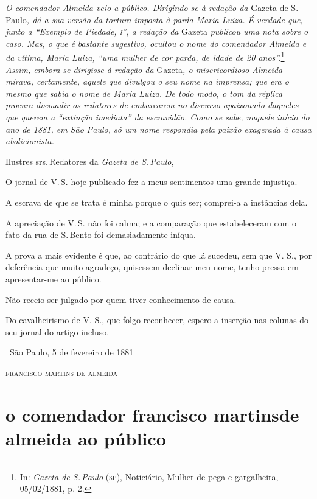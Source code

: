 \begin{resumo}
\emph{O comendador Almeida veio a público. Dirigindo-se à redação da}
Gazeta de S.\,Paulo\emph{, dá a sua versão da tortura imposta à parda
Maria Luiza. É verdade que, junto a ``Exemplo de Piedade, \textsc{i}'', a
redação da} Gazeta \emph{publicou uma nota sobre o caso. Mas, o que é
bastante sugestivo, ocultou o nome do comendador Almeida e da vítima,
Maria Luiza, ``uma mulher de cor parda, de idade de 20 anos''.}\footnote{
  In: \emph{Gazeta de S.\,Paulo} (\textsc{sp}), Noticiário, Mulher de pega e
  gargalheira, 05/02/1881, p. 2.}
\emph{Assim, embora se
dirigisse à redação da} Gazeta\emph{, o misericordioso Almeida mirava,
certamente, aquele que divulgou o seu nome na imprensa; que era o mesmo
que sabia o nome de Maria Luiza. De todo modo, o tom da réplica procura
dissuadir os redatores de embarcarem no discurso apaixonado daqueles que
querem a ``extinção imediata'' da escravidão. Como se sabe, naquele início
do ano de 1881, em São Paulo, só um nome respondia pela paixão exagerada
à causa abolicionista. }
\end{resumo}

Ilustres srs.\,Redatores da \emph{Gazeta de S.\,Paulo},

O jornal de V.\,S. hoje publicado fez a meus sentimentos uma grande
injustiça.

A escrava de que se trata é minha porque o quis ser; comprei-a a
instâncias dela.

A apreciação de V.\,S. não foi calma; e a comparação que estabeleceram
com o fato da rua de S.\,Bento foi demasiadamente iníqua.

A prova a mais evidente é que, ao contrário do que lá sucedeu, sem que
V. S., por deferência que muito agradeço, quisessem declinar meu nome,
tenho pressa em apresentar-me ao público.

Não receio ser julgado por quem tiver conhecimento de causa.

Do cavalheirismo de V. S., que folgo reconhecer, espero a inserção nas
colunas do seu jornal do artigo incluso.

\medskip
\hfill\ São Paulo, 5 de fevereiro de 1881

\hfill\textsc{francisco martins de almeida}

\section*{o comendador francisco martins\break de almeida ao público}

